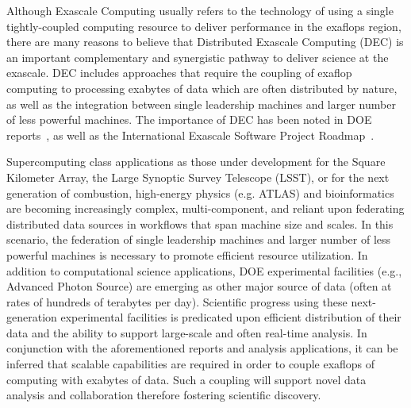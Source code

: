 \documentclass[11pt,final]{article}
\newcommand{\msnote}[1]{ {\textcolor{green} { ***Mark: #1 }}}
\newcommand{\mtnote}[1]{ {\textcolor{cyan} { ***Matteo: #1 }}}
\newcommand{\msnote}[1]{}
\newcommand{\mtnote}[1]{}
\begin{document}
{
Although Exascale Computing usually refers to the technology of using
a single tightly-coupled computing resource to deliver performance in
the exaflops region, there are many reasons to believe that
Distributed Exascale Computing (DEC) is an important complementary and
synergistic pathway to deliver science at the exascale.  DEC includes
approaches that require the coupling of exaflop computing to
processing exabytes of data which are often distributed by nature, as
well as the integration between single leadership machines and larger
number of less powerful machines. The importance of DEC has been noted
in DOE reports~\cite{dmav-exa}, as well as the International Exascale
Software Project Roadmap~\cite{iespr}.


Supercomputing class applications as those under development for the
Square Kilometer Array, the Large Synoptic Survey Telescope
(LSST), or for the next generation of combustion, high-energy physics
(e.g. ATLAS) and bioinformatics are becoming increasingly complex,
multi-component, and reliant upon federating distributed data sources
in workflows that span machine size and scales.  In this scenario, the
federation of single leadership machines and larger number of less
powerful machines is necessary to promote efficient resource
utilization.  In addition to computational science applications, DOE
experimental facilities (e.g., Advanced Photon Source) are emerging as
other major source of data (often at rates of hundreds of terabytes
per day).  Scientific progress using these next-generation
experimental facilities is predicated upon efficient distribution of
their data and the ability to support large-scale and often real-time
analysis.  In conjunction with the aforementioned reports and analysis
applications, it can be inferred that scalable capabilities are
required in order to couple exaflops of computing with exabytes of
data. Such a coupling will support novel data analysis and
collaboration therefore fostering scientific discovery.



}
\end{document}
